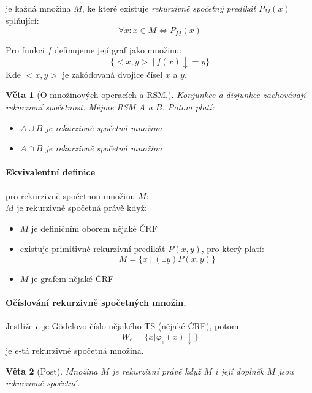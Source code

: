 \documentclass[a4paper]{article}      %
\newtheorem{theorem}{Věta}[section]
\newenvironment{definition}[1][Definice]{\begin{trivlist}
\item[\hskip \labelsep {\bfseries #1}]}{\end{trivlist}}
\begin{document}
\begin{definition}[Rekurzivně spočetná množina]
je každá množina $M$, ke které existuje \emph{rekurzivně spočetný predikát} $P_{M}(x)$ splňující:
\[
\forall x: x\in M \Leftrightarrow P_{M}(x)
\]
\end{definition}

\begin{definition}[Graf funkce.] Pro funkci $f$ definujeme její graf jako množinu:
\[
\lbrace <x,y>\ |\ f(x)\downarrow = y \rbrace
\]
Kde $<x,y>$ je zakódovaná dvojice čísel $x$ a $y$.
\end{definition}

\begin{theorem}[O množinových operacích a RSM.]
Konjunkce a disjunkce zachovávají rekurzivní spočetnost. Mějme RSM $A$ a $B$. Potom platí:
\begin{itemize}
\item $A \cup B$ je \emph{rekurzivně spočetná množina}
\item $A \cap B$ je \emph{rekurzivně spočetná množina}
\end{itemize}
\end{theorem}

\paragraph{Ekvivalentní definice} pro rekurzivně spočetnou množinu $M$:\\
$M$ je rekurzivně spočetná právě když:
\begin{itemize}
\item $M$ je definičním oborem nějaké ČRF
\item existuje primitivně rekurzivní predikát $P(x,y)$, pro který platí:
\[
M = \lbrace x\ |\ (\exists y)P(x,y)\rbrace
\]
\item $M$ je grafem nějaké ČRF
\end{itemize}

\paragraph{Očíslování rekurzivně spočetných množin.} Jestliže $e$ je G\"{o}delovo číslo nějakého TS (nějaké ČRF), potom
\[
W_{e} = \lbrace x | \varphi_{e}(x)\downarrow \rbrace
\] 
je $e$-tá rekurzivně spočetná množina.

\begin{theorem}[Post]
Množina $M$ je \emph{rekurzivní} právě když $M$ i její doplněk $\bar{M}$ jsou \emph{rekurzivně spočetné}.
\end{theorem}
\end{document}
